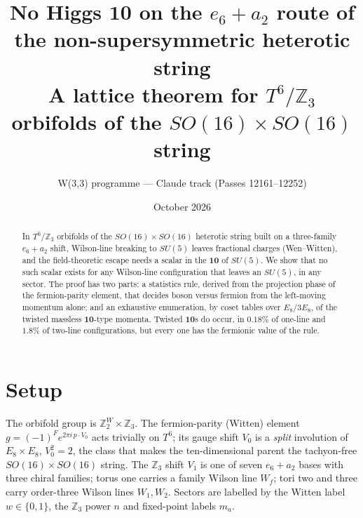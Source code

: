 \documentclass[11pt]{article}
\title{No Higgs $\mathbf{10}$ on the $e_6+a_2$ route of the non-supersymmetric heterotic string\\[2pt]
\large A lattice theorem for $T^6/\mathbb Z_3$ orbifolds of the $SO(16)\times SO(16)$ string}
\author{W(3,3) programme --- Claude track (Passes 12161--12252)}
\date{October 2026}
\begin{document}
\maketitle

\begin{abstract}
In $T^6/\mathbb Z_3$ orbifolds of the $SO(16)\times SO(16)$ heterotic string built on a three-family $e_6+a_2$ shift, Wilson-line breaking
to $SU(5)$ leaves fractional charges (Wen--Witten), and the field-theoretic escape needs a scalar in the $\mathbf{10}$ of $SU(5)$. We show
that no such scalar exists for any Wilson-line configuration that leaves an $SU(5)$, in any sector. The proof has two parts: a statistics
rule, derived from the projection phase of the fermion-parity element, that decides boson versus fermion from the left-moving momentum
alone; and an exhaustive enumeration, by coset tables over $E_8/3E_8$, of the twisted massless $\mathbf{10}$-type momenta. Twisted
$\mathbf{10}$s do occur, in $0.18\%$ of one-line and $1.8\%$ of two-line configurations, but every one has the fermionic value of the rule.
\end{abstract}

\section{Setup}
The orbifold group is $\mathbb Z_2^W\times\mathbb Z_3$. The fermion-parity (Witten) element $g=(-1)^F e^{2\pi i\,p\cdot V_0}$ acts
trivially on $T^6$; its gauge shift $V_0$ is a \emph{split} involution of $E_8\times E_8$, $V_0^2=2$, the class that makes the
ten-dimensional parent the tachyon-free $SO(16)\times SO(16)$ string. The $\mathbb Z_3$ shift $V_1$ is one of seven $e_6+a_2$ bases with
three chiral families; torus one carries a family Wilson line $W_f$; tori two and three carry order-three Wilson lines $W_1,W_2$.
Sectors are labelled by the Witten label $w\in\{0,1\}$, the $\mathbb Z_3$ power $n$ and fixed-point labels $m_a$.
\end{document}
